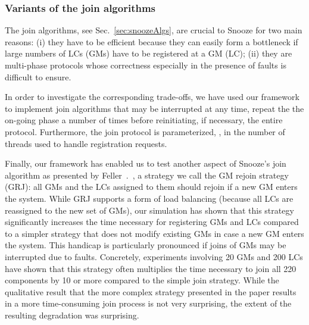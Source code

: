 \subsubsection{Variants of the join algorithms}

The join algorithms, see Sec.~\ref{sec:snoozeAlgs}, are crucial to
Snooze for two main reasons: (i) they have to be efficient because
they can easily form a bottleneck if large numbers of LCs (GMs) have
to be registered at a GM (LC); (ii) they are multi-phase protocols
whose correctness especially in the presence of faults is difficult to
ensure.

In order to investigate the corresponding trade-offs, we have used our
framework to implement join algorithms that may be interrupted at any
time, repeat the the on-going phase a number of times before
reinitiating, if necessary, the entire protocol. Furthermore, the join
protocol is parameterized, \eg, in the number of threads used to
handle registration requests.

Finally, our framework has enabled us to test another aspect of
Snooze's join algorithm as presented by
Feller~\etal.~\cite{feller:ccgrid12}, a strategy we call the GM rejoin
strategy (GRJ): all GMs and the LCs assigned to them should rejoin if
a new GM enters the system. While GRJ supports a form of load
balancing (because all LCs are reassigned to the new set of GMs), our
simulation has shown that this strategy significantly increases the
time necessary for registering GMs and LCs compared to a simpler
strategy that does not modify existing GMs in case a new GM enters the
system. This handicap is particularly pronounced if joins of GMs may
be interrupted due to faults. Concretely, experiments involving 20 GMs
and 200 LCs have shown that this strategy often multiplies the time
necessary to join all 220 components by 10 or more compared to the
simple join strategy. While the qualitative result that the more
complex strategy presented in the paper results in a more
time-consuming join process is not very surprising, the extent of the
resulting degradation was surprising.

